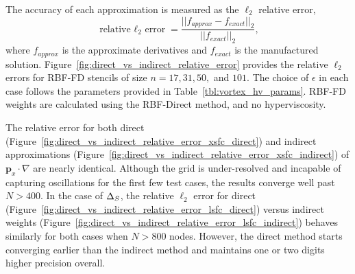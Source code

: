 The accuracy of each approximation is measured as the $\ell_2$ relative error,  
$$ \text{relative $\ell_{2}$ error} = \frac{|| f_{approx} - f_{exact} ||_{2} }{ || f_{exact} ||_{2} }, $$ 
where $f_{approx}$ is the approximate derivatives and $f_{exact}$ is the manufactured solution. Figure~\ref{fig:direct_vs_indirect_relative_error} provides the relative $\ell_{2}$ errors for RBF-FD stencils of size $n=17, 31, 50,$ and $101$. The choice of $\epsilon$ in each case follows the parameters provided in Table~\ref{tbl:vortex_hv_params}. RBF-FD weights are calculated using the RBF-Direct method, and no hyperviscosity. 

The relative error for both direct (Figure~\ref{fig:direct_vs_indirect_relative_error_xsfc_direct}) and indirect approximations (Figure~\ref{fig:direct_vs_indirect_relative_error_xsfc_indirect}) of $\mathbf{p}_{x} \cdot \nabla$ are nearly identical. Although the grid is under-resolved and incapable of capturing oscillations for the first few test cases, the results converge well past $N > 400$. In the case of $\Delta_S$, the relative $\ell_2$ error for direct (Figure~\ref{fig:direct_vs_indirect_relative_error_lsfc_direct}) versus indirect weights (Figure~\ref{fig:direct_vs_indirect_relative_error_lsfc_indirect}) behaves similarly for both cases when $N > 800$ nodes. However, the direct method starts converging earlier than the indirect method and maintains one or two digits higher precision overall. %

